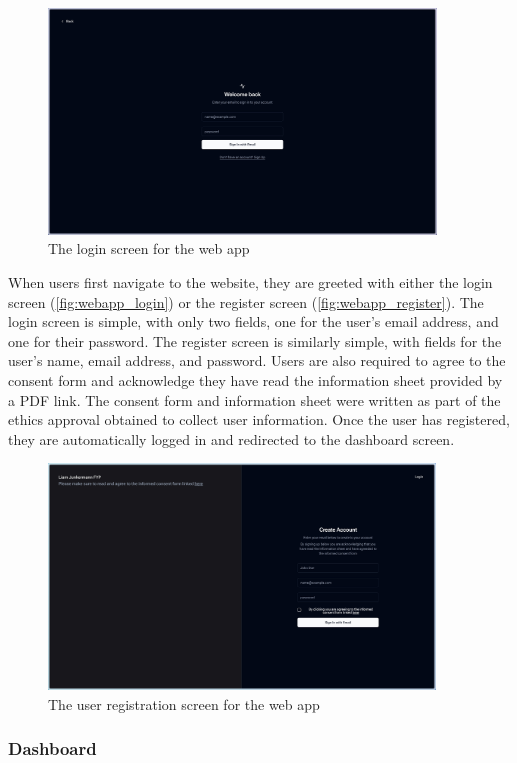 \begin{figure}[htbp]
  \centering
  \includegraphics[height=6cm]{figures/fyp_login.jpeg}
  \captionsetup{justification=centering}
  \caption[Web app Login]{The login screen for the web app} \label{fig:webapp_login}
\end{figure}
When users first navigate to the website, they are greeted with either the login screen (\autoref{fig:webapp_login}) or the register screen (\autoref{fig:webapp_register}). The login screen is simple, with only two fields, one for the user's email address, and one for their password. The register screen is similarly simple, with fields for the user's name, email address, and password. Users are also required to agree to the consent form and acknowledge they have read the information sheet provided by a PDF link. The consent form and information sheet were written as part of the ethics approval obtained to collect user information. Once the user has registered, they are automatically logged in and redirected to the dashboard screen.
\begin{figure}[htbp]
  \centering
  \includegraphics[height=6cm]{figures/fyp_register.jpeg}
  \captionsetup{justification=centering}
  \caption[Web app Register]{The user registration screen for the web app} \label{fig:webapp_register}
\end{figure}
\subsubsection{Dashboard}

